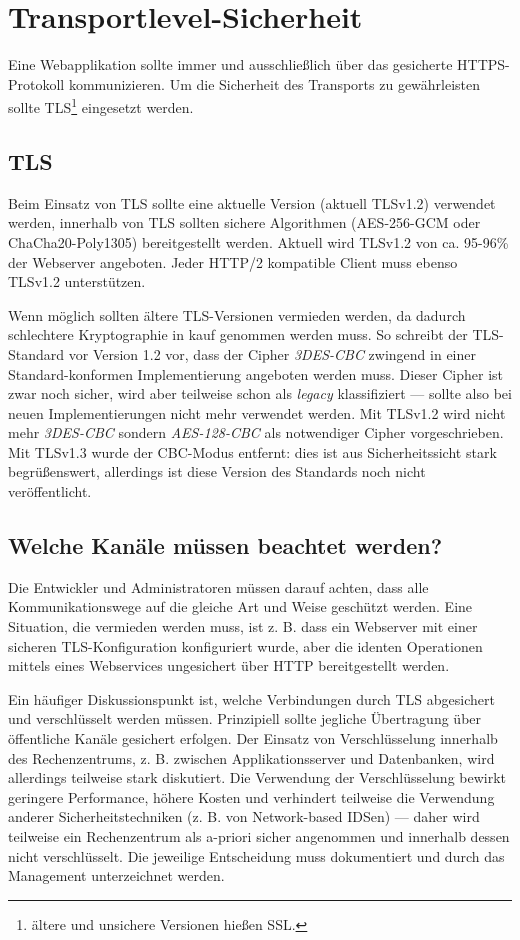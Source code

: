 \section{Transportlevel-Sicherheit}

Eine Webapplikation sollte immer und ausschließlich über das gesicherte HTTPS-Protokoll kommunizieren. Um die Sicherheit des Transports zu gewährleisten sollte TLS\footnote{ältere und unsichere Versionen hießen SSL.} eingesetzt werden.

\subsection{TLS}

Beim Einsatz von TLS sollte eine aktuelle Version (aktuell TLSv1.2) verwendet werden, innerhalb von TLS sollten sichere Algorithmen (AES-256-GCM oder ChaCha20-Poly1305) bereitgestellt werden. Aktuell wird TLSv1.2 von ca. 95-96\% der Webserver angeboten. Jeder HTTP/2 kompatible Client muss ebenso TLSv1.2 unterstützen.

Wenn möglich sollten ältere TLS-Versionen vermieden werden, da dadurch schlechtere Kryptographie in kauf genommen werden muss. So schreibt der TLS-Standard vor Version 1.2 vor, dass der Cipher \textit{3DES-CBC} zwingend in einer Standard-konformen Implementierung angeboten werden muss. Dieser Cipher ist zwar noch sicher, wird aber teilweise schon als \textit{legacy} klassifiziert --- sollte also bei neuen Implementierungen nicht mehr verwendet werden. Mit TLSv1.2 wird nicht mehr \textit{3DES-CBC} sondern \textit{AES-128-CBC} als notwendiger Cipher vorgeschrieben. Mit TLSv1.3 wurde der CBC-Modus entfernt: dies ist aus Sicherheitssicht stark begrüßenswert, allerdings ist diese Version des Standards noch nicht veröffentlicht.

\subsection{Welche Kanäle müssen beachtet werden?}

Die Entwickler und Administratoren müssen darauf achten, dass alle Kommunikationswege auf die gleiche Art und Weise geschützt werden. Eine Situation, die vermieden werden muss, ist z. B. dass ein Webserver mit einer sicheren TLS-Konfiguration konfiguriert wurde, aber die identen Operationen mittels eines Webservices ungesichert über HTTP bereitgestellt werden.

Ein häufiger Diskussionspunkt ist, welche Verbindungen durch TLS abgesichert und verschlüsselt werden müssen. Prinzipiell sollte jegliche Übertragung über öffentliche Kanäle gesichert erfolgen. Der Einsatz von Verschlüsselung innerhalb des Rechenzentrums, z. B. zwischen Applikationsserver und Datenbanken, wird allerdings teilweise stark diskutiert. Die Verwendung der Verschlüsselung bewirkt geringere Performance, höhere Kosten und verhindert teilweise die Verwendung anderer Sicherheitstechniken (z. B. von Network-based IDSen) --- daher wird teilweise ein Rechenzentrum als a-priori sicher angenommen und innerhalb dessen nicht verschlüsselt. Die jeweilige Entscheidung muss dokumentiert und durch das Management unterzeichnet werden.

